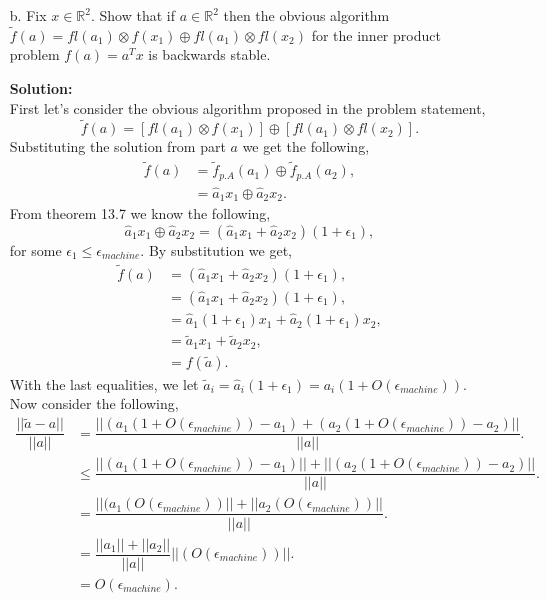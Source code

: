 \documentclass[12pt]{article}
\makeatletter
\theoremstyle{homework}
\newenvironment{exercise}[1]
{\def\@currentlabel{#1}\exercisecore}
{\endexercisecore}
\newcommand{\localhead}[1]{\par\smallskip\noindent\textbf{#1}\nobreak\\}%
\newcommand\solution{\localhead{Solution:}}
\newcommand{\Reals}{\ensuremath{\mathbb R}}
\newcommand{\emach}{\ensuremath{\epsilon_{machine}}}
\let\RR\Reals
\makeatother
\begin{document}
\begin{exercise}{P21}
\begin{enumerate}
  \item[b.] Fix $x\in \RR^2$. Show that if $a \in \RR^2$ then the obvious algorithm 
  $\tilde{f}(a) = fl(a_1) \otimes f(x_1) \oplus fl(a_1) \otimes fl(x_2)$ for the inner product problem $f(a) = a^{T}x$ is 
  backwards stable.\\
  \solution First let's consider the obvious algorithm proposed in the problem statement, 
  \begin{equation*}
    \tilde{f}(a) = [fl(a_1) \otimes f(x_1)] \oplus [fl(a_1) \otimes fl(x_2)].
  \end{equation*}
  Substituting the solution from part $a$ we get the following, 
  \begin{align*}
    \tilde{f}(a) &= \tilde{f}_{p.A}(a_1) \oplus \tilde{f}_{p.A}(a_2),\\
     &= \hat{a}_1x_1 \oplus \hat{a}_2x_2.
  \end{align*}
  From theorem 13.7 we know the following, 
  \begin{equation*}
    \hat{a}_1x_1 \oplus \hat{a}_2x_2 = (\hat{a}_1x_1 + \hat{a}_2x_2)(1 + \epsilon_{1}),
  \end{equation*}
  for some $\epsilon_{1} \leq \emach$. By substitution we get, 
  \begin{align*}
    \tilde{f}(a) &=  (\hat{a}_1x_1 + \hat{a}_2x_2)(1 + \epsilon_{1}),\\
                &=(\hat{a}_1x_1 + \hat{a}_2x_2)(1 + \epsilon_{1}),\\
                &=\hat{a}_1(1 + \epsilon_{1})x_1 + \hat{a}_2(1 + \epsilon_{1})x_2,\\
                &=\tilde{a}_1x_1 + \tilde{a}_2x_2,\\
                &=f(\tilde{a}).
  \end{align*}
  With the last equalities, we let $\tilde{a}_i = \hat{a}_i(1 + \epsilon_{1}) = a_i(1 + O(\emach))$. Now consider the following, 
  \begin{align*}
    \dfrac{||\tilde{a} - a||}{||a||} &= \dfrac{||(a_1(1 + O(\emach)) - a_1) + (a_2(1 + O(\emach)) - a_2)||}{||a||}.\\
    &\leq \dfrac{||(a_1(1 + O(\emach)) - a_1)|| + ||(a_2(1 + O(\emach)) - a_2)||}{||a||}.\\
    &= \dfrac{||(a_1(O(\emach))|| + ||a_2(O(\emach))||}{||a||}.\\
    &= \dfrac{||a_1|| + ||a_2||}{||a||} ||(O(\emach))||.\\
    &= O(\emach).
  \end{align*}
  \vspace{.15in}
  

\end{enumerate}
\end{exercise}
\end{document}
